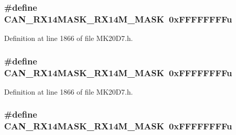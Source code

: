 \subsubsection[{\texorpdfstring{C\+A\+N\+\_\+\+R\+X14\+M\+A\+S\+K\+\_\+\+R\+X14\+M\+\_\+\+M\+A\+SK}{CAN_RX14MASK_RX14M_MASK}}]{\setlength{\rightskip}{0pt plus 5cm}\#define C\+A\+N\+\_\+\+R\+X14\+M\+A\+S\+K\+\_\+\+R\+X14\+M\+\_\+\+M\+A\+SK~0x\+F\+F\+F\+F\+F\+F\+F\+Fu}\hypertarget{group___c_a_n___register___masks_ga4687420a607d4279e24fa93f4b486ec3}{}\label{group___c_a_n___register___masks_ga4687420a607d4279e24fa93f4b486ec3}


Definition at line 1866 of file M\+K20\+D7.\+h.

\subsubsection[{\texorpdfstring{C\+A\+N\+\_\+\+R\+X14\+M\+A\+S\+K\+\_\+\+R\+X14\+M\+\_\+\+M\+A\+SK}{CAN_RX14MASK_RX14M_MASK}}]{\setlength{\rightskip}{0pt plus 5cm}\#define C\+A\+N\+\_\+\+R\+X14\+M\+A\+S\+K\+\_\+\+R\+X14\+M\+\_\+\+M\+A\+SK~0x\+F\+F\+F\+F\+F\+F\+F\+Fu}\hypertarget{group___c_a_n___register___masks_ga4687420a607d4279e24fa93f4b486ec3}{}\label{group___c_a_n___register___masks_ga4687420a607d4279e24fa93f4b486ec3}


Definition at line 1866 of file M\+K20\+D7.\+h.

\subsubsection[{\texorpdfstring{C\+A\+N\+\_\+\+R\+X14\+M\+A\+S\+K\+\_\+\+R\+X14\+M\+\_\+\+M\+A\+SK}{CAN_RX14MASK_RX14M_MASK}}]{\setlength{\rightskip}{0pt plus 5cm}\#define C\+A\+N\+\_\+\+R\+X14\+M\+A\+S\+K\+\_\+\+R\+X14\+M\+\_\+\+M\+A\+SK~0x\+F\+F\+F\+F\+F\+F\+F\+Fu}\hypertarget{group___c_a_n___register___masks_ga4687420a607d4279e24fa93f4b486ec3}{}\label{group___c_a_n___register___masks_ga4687420a607d4279e24fa93f4b486ec3}


